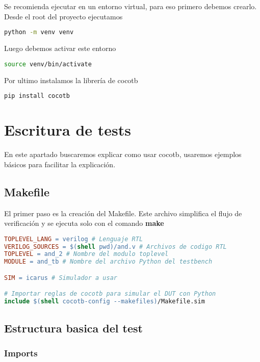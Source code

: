 \documentclass[a4paper,12pt]{article}
\begin{document}
Se recomienda ejecutar en un entorno virtual, para eso primero debemos crearlo. Desde el root del proyecto ejecutamos
\begin{lstlisting}[language=bash]
python -m venv venv
\end{lstlisting}

Luego debemos activar este entorno
\begin{lstlisting}[language=bash]
source venv/bin/activate
\end{lstlisting}

Por ultimo instalamos la librería de cocotb
\begin{lstlisting}[language=bash]
pip install cocotb
\end{lstlisting}

\newpage

\section{Escritura de tests}
En este apartado buscaremos explicar como usar cocotb, usaremos ejemplos básicos para facilitar la explicación.

\subsection{Makefile}

El primer paso es la creación del Makefile. Este archivo simplifica el flujo de verificación y se ejecuta solo con el comando \textbf{make}

\begin{lstlisting}[language=make, caption=Makefile, frame=lines]
TOPLEVEL_LANG = verilog # Lenguaje RTL
VERILOG_SOURCES = $(shell pwd)/and.v # Archivos de codigo RTL
TOPLEVEL = and_2 # Nombre del modulo toplevel
MODULE = and_tb # Nombre del archivo Python del testbench

SIM = icarus # Simulador a usar

# Importar reglas de cocotb para simular el DUT con Python
include $(shell cocotb-config --makefiles)/Makefile.sim
\end{lstlisting}


\subsection{Estructura basica del test}

\subsubsection{Imports}
\end{document}
